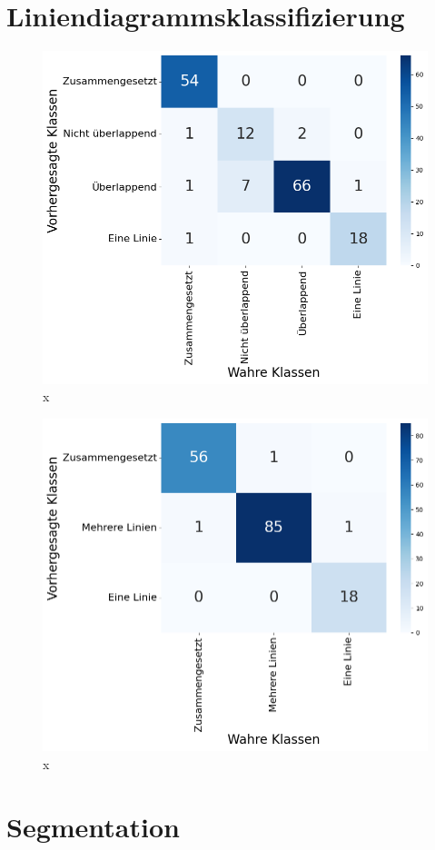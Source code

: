 \section{Liniendiagrammsklassifizierung}
\begin{figure}[H]
    \centering
    \captionsetup{width=.75\linewidth}
    \includegraphics[width=.75\textwidth]{Experimente/img/classify/val_v1/matrix.png}
    \caption{ x}
    \label{fig:extraction_output}
\end{figure}
\begin{figure}[H]
    \centering
    \captionsetup{width=.75\linewidth}
    \includegraphics[width=.75\textwidth]{Experimente/img/classify/val_v2/matrix.png}
    \caption{ x}
    \label{fig:extraction_output}
\end{figure}

\section{Segmentation}
